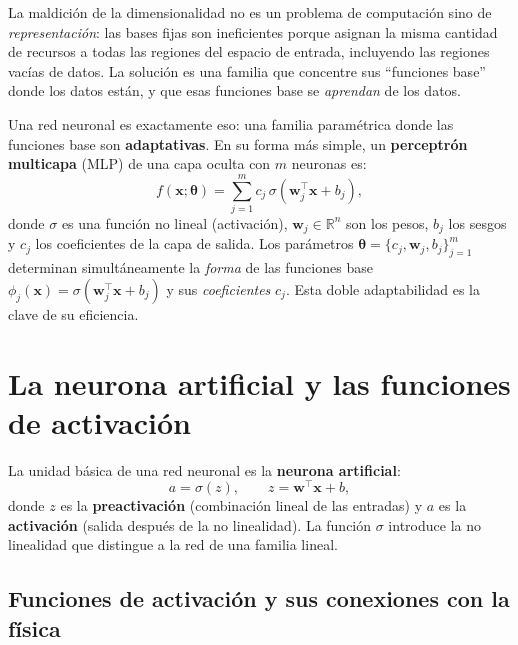La maldición de la dimensionalidad no es un problema de computación
sino de \emph{representación}: las bases fijas son ineficientes porque
asignan la misma cantidad de recursos a todas las regiones del espacio
de entrada, incluyendo las regiones vacías de datos. La solución es una
familia que concentre sus ``funciones base'' donde los datos están, y
que esas funciones base se \emph{aprendan} de los datos.

Una red neuronal es exactamente eso: una familia paramétrica donde las
funciones base son \textbf{adaptativas}. En su forma más simple, un
\textbf{perceptrón multicapa} (MLP) de una capa oculta con $m$ neuronas
es:
\begin{equation}
  f(\bm{x};\bm{\theta})
  = \sum_{j=1}^m c_j\,\sigma(\bm{w}_j^\top\bm{x} + b_j),
  \label{eq:mlp_una_capa}
\end{equation}
donde $\sigma$ es una función no lineal (activación), $\bm{w}_j \in
\mathbb{R}^n$ son los pesos, $b_j$ los sesgos y $c_j$ los coeficientes
de la capa de salida. Los parámetros
$\bm{\theta} = \{c_j, \bm{w}_j, b_j\}_{j=1}^m$ determinan
simultáneamente la \emph{forma} de las funciones base
$\phi_j(\bm{x}) = \sigma(\bm{w}_j^\top\bm{x}+b_j)$ y sus
\emph{coeficientes} $c_j$. Esta doble adaptabilidad es la clave de su
eficiencia.

\section{La neurona artificial y las funciones de activación}
\label{sec:neurona}


La unidad básica de una red neuronal es la \textbf{neurona artificial}:
\begin{equation}
  a = \sigma(z), \qquad z = \bm{w}^\top\bm{x} + b,
  \label{eq:neurona}
\end{equation}
donde $z$ es la \textbf{preactivación} (combinación lineal de las
entradas) y $a$ es la \textbf{activación} (salida después de la no
linealidad). La función $\sigma$ introduce la no linealidad que
distingue a la red de una familia lineal.

\subsection{Funciones de activación y sus conexiones con la física}
\label{subsec:activaciones}

